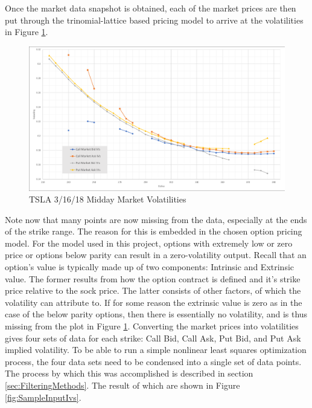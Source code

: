 \documentclass[12pt, a4paper, notitlepage]{article}
\numberwithin{equation}{subsection}
\numberwithin{figure}{subsection}
\numberwithin{table}{subsection}
\newcommand{\newpar}{\newline \newline}
\begin{document}
Once the market data snapshot is obtained, each of the market prices are then put through the trinomial-lattice based pricing model to arrive at the volatilities in Figure \ref{fig:SampleOptionMarketIVs}.

\begin{figure}[H]
	\caption{TSLA 3/16/18 Midday Market Volatilities}
	\centerline{\includegraphics[width=1\textwidth]{SampleOptionMarketIVs}}
	\label{fig:SampleOptionMarketIVs}
\end{figure}

Note now that many points are now missing from the data, especially at the ends of the strike range.  The reason for this is embedded in the chosen option pricing model.  For the model used in this project, options with extremely low or zero price or options below parity can result in a zero-volatility output.  Recall that an option's value is typically made up of two components:  Intrinsic and Extrinsic value.  The former results from how the option contract is defined and it's strike price relative to the sock price.  The latter consists of other factors, of which the volatility can attribute to.  If for some reason the extrinsic value is zero as in the case of the below parity options, then there is essentially no volatility, and is thus missing from the plot in Figure \ref{fig:SampleOptionMarketIVs}.
\newpar
Converting the market prices into volatilities gives four sets of data for each strike:  Call Bid, Call Ask, Put Bid, and Put Ask implied volatility.  To be able to run a simple nonlinear least squares optimization process, the four data sets need to be condensed into a single set of data points.  The process by which this was accomplished is described in section \ref{sec:FilteringMethods}.  The result of which are shown in Figure \ref{fig:SampleInputIvs}.
\end{document}
